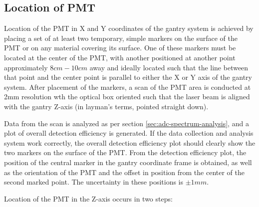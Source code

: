 \documentclass[journal]{IEEEtran}
\begin{document}
\subsection{Location of PMT}

Location of the PMT in X and Y coordinates of the gantry system is achieved by placing a set of at least two temporary, simple markers on the surface of the PMT or on any material covering its surface.  One of these markers must be located at the center of the PMT, with another positioned at another point approximately $8cm-10cm$ away and ideally located such that the line between that point and the center point is parallel to either the X or Y axis of the gantry system. After placement of the markers, a scan of the PMT area is conducted at 2mm resolution wth the optical box oriented such that the laser beam is aligned with the gantry Z-axis (in layman's terms, pointed straight down).

Data from the scan is analyzed as per section \ref{sec:adc-spectrum-analysis}, and a plot of overall detection efficiency is generated. If the data collection and analysis system work correctly, the overall detection efficiency plot should clearly show the two markers on the surface of the PMT.  From the detection efficiency plot, the position of the central marker in the gantry coordinate frame is obtained, as well as the orientation of the PMT and the offset in position from the center of the second marked point. The uncertainty in these positions is $\pm1mm$.  

Location of the PMT in the Z-axis occurs in two steps:
\end{document}
